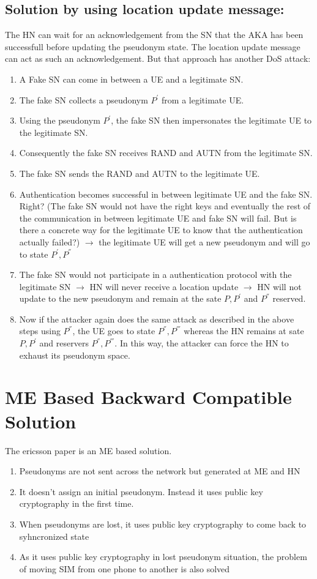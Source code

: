 \documentclass[runningheads,a4paper]{llncs} %
\begin{document}
\subsection{Solution by using location update message:}
The HN can wait for an acknowledgement from the SN that the AKA has been successfull before updating the pseudonym state. The location update message can act as such an acknowledgement. But that approach has another DoS attack:

\begin{enumerate}
\item A Fake SN can come in between a UE and a legitimate SN. 
\item The fake SN collects a pseudonym $P^{'}$ from a legitimate UE. 
\item Using the pseudonym $P^{'}$, the fake SN then impersonates the legitimate UE to the legitimate SN. 
\item Consequently the fake SN receives RAND and AUTN from the legitimate SN. 
\item The fake SN sends the RAND and AUTN to the legitimate UE. 
\item Authentication becomes successful in between legitimate UE and the fake SN. Right?  (The fake SN would not have the right keys and eventually the rest of the communication in between legitimate UE and fake SN will fail. But is there a concrete way for the legitimate UE to know that the authentication actually failed?) $\rightarrow$ the legitimate UE will get a new pseudonym and will go to state $P^{'},P^{''}$
\item The fake SN would not participate in a authentication protocol with the legitimate SN $\rightarrow$ HN will never receive a location update $\rightarrow$ HN will not update to the new pseudonym and remain at the sate $P,P^{'}$ and $P^{''}$ reserved.
\item Now if the attacker again does the same attack as described in the above steps using $P^{''}$, the UE goes to state $P^{''},P^{'''}$ whereas the HN remains at sate $P,P^{'}$ and reservers $P^{''},P^{'''}$. In this way, the attacker can force the HN to exhaust its pseudonym space.
\end{enumerate}



\section{ME Based Backward Compatible Solution}
The ericsson paper is an ME based solution. 
\begin{enumerate}
\item Pseudonyms are not sent across the network but generated at ME and HN
\item It doesn't assign an initial pseudonym. Instead it uses public key cryptography in the first time.
\item When pseudonyms are lost, it uses public key cryptography to come back to syhncronized state
\item As it uses public key cryptography in lost pseudonym situation, the problem of moving SIM from one phone to another is also solved
\end{enumerate}
\end{document}
